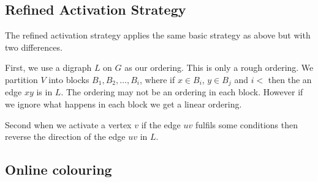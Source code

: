 \subsection{Refined Activation Strategy}
The refined activation strategy applies the same basic strategy as above but with two differences. 

First, we use a digraph $L$ on $G$ as our ordering. This is only a rough ordering. We partition $V$ into blocks $B_1,B_2,\dots,B_i$, where if $x \in B_i$, $y \in B_j$ and $i <$ then the an edge $xy$ is in $L$. The ordering may not be an ordering in each block. However if we ignore what happens in each block we get a linear ordering.

Second when we activate a vertex $v$ if the edge $uv$ fulfils some conditions then reverse the direction of the edge $uv$ in $L$.

\subsection{Online colouring}

        


















